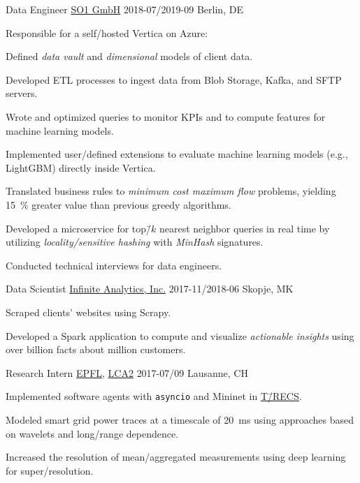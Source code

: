 \documentclass[%
version=last,%
fontsize=11pt,%
paper=A4,%
headinclude=false,%
footinclude=false,%
headlines=0,%
footlines=0,%
areasetadvanced,%
toc=bibnumbered,%
]{scrartcl}%
\begin{document}
\begin{minipage}[t]{0.575\textwidth}
  \WorkEntry%
  {Data Engineer}%
  {\href{https://www.so1.ai/en/}{SO1 GmbH}}%
  {2018-07/2019-09}%
  {Berlin, DE}%
  {%
    \begin{Items}
    \item Responsible for a self\-/hosted Vertica on Azure:
      \begin{Items}
      \item Defined \emph{data vault} and \emph{dimensional} models of client
        data.
      \item Developed ETL processes to ingest data from Blob Storage, Kafka, and
        SFTP servers.
      \item Wrote and optimized queries to monitor KPIs and to compute features
        for machine learning models.
      \item Implemented user\-/defined extensions to evaluate machine learning
        models (e.g., LightGBM) directly inside Vertica.
      \end{Items}
    \item Translated business rules to \emph{minimum cost maximum flow}
      problems, yielding \SI{15}{\percent} greater value than previous greedy
      algorithms.
    \item Developed a microservice for top\=/\(k\) nearest neighbor queries in
      real time by utilizing \emph{locality\-/sensitive hashing} with
      \emph{MinHash} signatures.
    \item Conducted technical interviews for data engineers.
    \end{Items}%
  }

  \WorkEntry%
  {Data Scientist}%
  {\href{http://infiniteanalytics.com/}{Infinite Analytics, Inc.}}%
  {2017-11/2018-06}%
  {Skopje, MK}%
  {%
    \begin{Items}
    \item Scraped clients’ websites using Scrapy.
    \item Developed a Spark application to compute and visualize
      \emph{actionable insights} using over  billion facts about
       million customers.
    \end{Items}%
  }

  \WorkEntry%
  {Research Intern}%
  {\href{https://epfl.ch/}{EPFL}, \href{http://lca.epfl.ch/}{LCA2}}%
  {2017-07/09}%
  {Lausanne, CH}%
  {%
    \begin{Items}
    \item Implemented software agents with \texttt{asyncio} and
      Mininet in
      \href{https://www.epfl.ch/labs/desl-pwrs/smartgrid/t-recs/}{T\=/RECS}.
    \item Modeled smart grid power traces at a timescale of \SI{20}{\ms} using
      approaches based on wavelets and long\-/range dependence.
    \item Increased the resolution of mean\-/aggregated measurements using deep
      learning for super\-/resolution.
    \end{Items}%
  }


\end{minipage}
\end{document}
